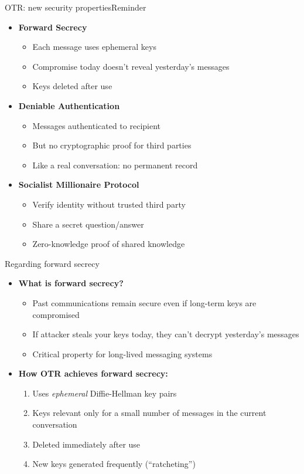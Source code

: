\ifdefined\PRESENTATION\else\PassOptionsToClass{handout}{beamer}\fi\documentclass[aspectratio=169, lualatex]{beamer}
\begin{document}
\begin{frame}{OTR: new security properties}{Reminder}
	\begin{itemize}
		\item \textbf{Forward Secrecy}
		      \begin{itemize}
			      \item Each message uses ephemeral keys
			      \item Compromise today doesn't reveal yesterday's messages
			      \item Keys deleted after use
		      \end{itemize}
		\item \textbf{Deniable Authentication}
		      \begin{itemize}
			      \item Messages authenticated to recipient
			      \item But no cryptographic proof for third parties
			      \item Like a real conversation: no permanent record
		      \end{itemize}
		\item \textbf{Socialist Millionaire Protocol}
		      \begin{itemize}
			      \item Verify identity without trusted third party
			      \item Share a secret question/answer
			      \item Zero-knowledge proof of shared knowledge
		      \end{itemize}
	\end{itemize}
\end{frame}

\begin{frame}{Regarding forward secrecy}
	\begin{itemize}
		\item \textbf{What is forward secrecy?}
		      \begin{itemize}
			      \item Past communications remain secure even if long-term keys are compromised
			      \item If attacker steals your keys today, they can't decrypt yesterday's messages
			      \item Critical property for long-lived messaging systems
		      \end{itemize}
		\item \textbf{How OTR achieves forward secrecy:}
		      \begin{enumerate}
			      \item Uses \textit{ephemeral} Diffie-Hellman key pairs
			      \item Keys relevant only for a small number of messages in the current conversation
			      \item Deleted immediately after use
			      \item New keys generated frequently (``ratcheting'')
		      \end{enumerate}
	\end{itemize}
\end{frame}
\end{document}
